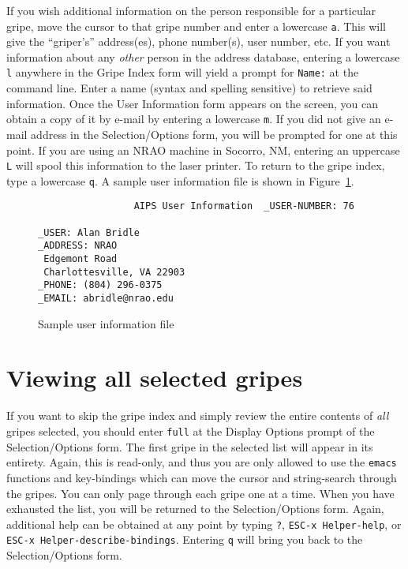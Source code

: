 If you wish additional information on the person responsible for a
particular gripe, move the cursor to that gripe number and enter a
lowercase {\tt a}. This will give the ``griper's'' address(es), phone
number(s), user number, etc.  If you want information about any {\it
other} person in the address database, entering a lowercase {\tt l}
anywhere in the Gripe Index form will yield a prompt for {\tt Name:}
at the command line.  Enter a name (syntax and spelling sensitive) to
retrieve said information.  Once the User Information form appears on
the screen, you can obtain a copy of it by e-mail by entering a
lowercase {\tt m}.  If you did not give an e-mail address in the
Selection/Options form, you will be prompted for one at this point. If
you are using an NRAO machine in Socorro, NM, entering an uppercase
{\tt L} will spool this information to the laser printer.  To return
to the gripe index, type a lowercase {\tt q}. A sample user
information file is shown in Figure~\ref{fig:userinfo}.
\begin{figure}
\begin{center}
\begin{verbatim}
                 AIPS User Information  _USER-NUMBER: 76

_USER: Alan Bridle
_ADDRESS: NRAO
 Edgemont Road
 Charlottesville, VA 22903
_PHONE: (804) 296-0375
_EMAIL: abridle@nrao.edu
\end{verbatim}
\end{center}
\caption{Sample user information file}
\label{fig:userinfo}
\end{figure}

\section{Viewing all selected gripes}

If you want to skip the gripe index and simply review the entire
contents of {\it all} gripes selected, you should enter {\tt full} at
the Display Options prompt of the Selection/Options form.  The first
gripe in the selected list will appear in its entirety.  Again, this
is read-only, and thus you are only allowed to use the {\tt emacs}
functions and key-bindings which can move the cursor and string-search
through the gripes.  You can only page through each gripe one at a
time.  When you have exhausted the list, you will be returned to the
Selection/Options form.  Again, additional help can be obtained at any
point by typing {\tt ?}, {\tt ESC-x Helper-help}, or {\tt ESC-x
Helper-describe-bindings}. Entering {\tt q} will bring you back to the
Selection/Options form.


